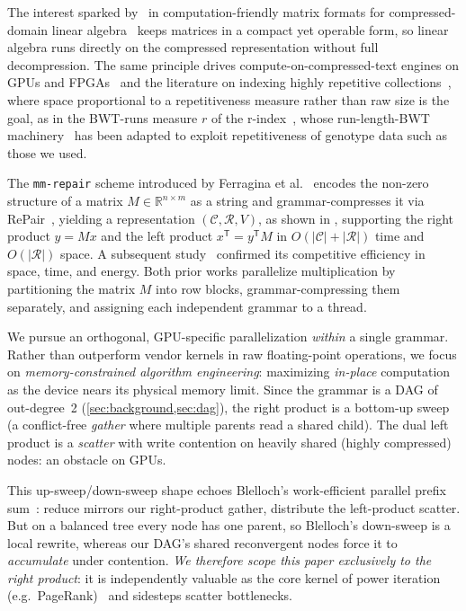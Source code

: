 \documentclass[twoside,leqno,twocolumn]{article}
\begin{document}
The interest sparked by~\cite{cla_vldbj,cla_cacm} in computation-friendly matrix formats for compressed-domain linear algebra~\cite{impossibility_gra_linalg,accelerating_gnn,arroyuelo2026boosting,rpq-k2tree-vldbj,aware,unified_lossless_sparse,mmrepair,francisco2022friendly,efficient_marino,greener} keeps matrices in a compact yet operable form, so linear algebra runs directly on the compressed representation without full decompression. The same principle drives compute-on-compressed-text engines on GPUs and FPGAs~\cite{gtadoc,ftadoc} and the literature on indexing highly repetitive collections~\cite{navarro-rep-i,navarro-rep-ii}, where space proportional to a repetitiveness measure rather than raw size is the goal, as in the BWT-runs measure $r$ of the r-index~\cite{rindex_soda,rindex_jacm}, whose run-length-BWT machinery~\cite{boucher-uk-biobank} has been adapted to exploit repetitiveness of genotype data such as those we used.

The \texttt{mm-repair} scheme introduced by Ferragina et al.~\cite{mmrepair} encodes the non-zero structure of a matrix $M\in\mathbb{R}^{n\times m}$ as a string and grammar-compresses it via RePair~\cite{repair}, yielding a representation $(\mathcal{C},\mathcal{R},V)$, as shown in , supporting the right product $y=Mx$ and the left product $x^{\mathsf{T}}=y^{\mathsf{T}}M$ in $O(|\mathcal{C}|+|\mathcal{R}|)$ time and $O(|\mathcal{R}|)$ space. A subsequent study~\cite{greener} confirmed its competitive efficiency in space, time, and energy. Both prior works \cite{mmrepair,greener} parallelize multiplication by partitioning the matrix $M$ into row blocks, grammar-compressing them separately, and assigning each independent grammar to a thread.

We pursue an orthogonal, GPU-specific parallelization \emph{within} a single grammar. Rather than outperform vendor kernels in raw floating-point operations, we focus on \emph{memory-constrained algorithm engineering}: maximizing \emph{in-place} computation as the device nears its physical memory limit. Since the grammar is a DAG of out-degree~2 (\cref{sec:background,sec:dag}), the right product is a bottom-up sweep (a conflict-free \emph{gather} where multiple parents read a shared child). The dual left product is a \emph{scatter} with write contention on heavily shared (highly compressed) nodes: an obstacle on GPUs.

This up-sweep/down-sweep shape echoes Blelloch's work-efficient parallel prefix sum~\cite{BlellochTR90}: reduce mirrors our right-product gather, distribute the left-product scatter. But on a balanced tree every node has one parent, so Blelloch's down-sweep is a local rewrite, whereas our DAG's shared reconvergent nodes force it to \emph{accumulate} under contention. \emph{We therefore scope this paper exclusively to the right product}: it is independently valuable as the core kernel of power iteration (e.g.\ PageRank)~\cite{mmrepair,greener,francisco2022friendly} and sidesteps scatter bottlenecks.
\end{document}

